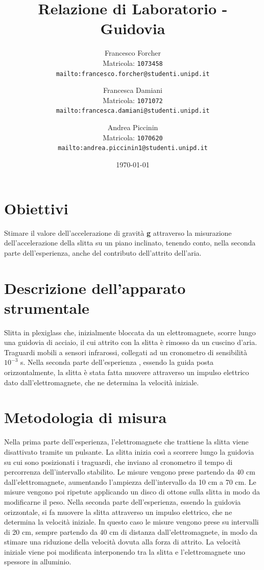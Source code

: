 \documentclass[12pt]{article} %
\title {Relazione di Laboratorio - Guidovia}
\author{Francesco Forcher\\
Matricola: \texttt{1073458}\\
\texttt{mailto:francesco.forcher@studenti.unipd.it}\\
\and
Francesca Damiani\\ 
Matricola: \texttt{1071072}\\
\texttt{mailto:francesca.damiani@studenti.unipd.it}\\
\and
Andrea Piccinin\\ 
Matricola: \texttt{1070620}\\
\texttt{mailto:andrea.piccinin1@studenti.unipd.it}\\
}
\date{\today}
\begin{document}
\maketitle %
\newpage
\tableofcontents %



        
\newpage
\section{Obiettivi}
	Stimare il valore dell'accelerazione di gravità \textbf{g} attraverso la misurazione dell'accelerazione della slitta su un piano 
	inclinato, tenendo conto, nella seconda parte dell'esperienza, anche del contributo dell'attrito dell'aria.

\section{Descrizione dell'apparato strumentale}
	Slitta in plexiglass che, inizialmente bloccata da un elettromagnete, scorre lungo una guidovia di acciaio, il cui attrito con la 		slitta è rimosso da un cuscino d'aria. 
	Traguardi mobili a sensori infrarossi, collegati ad un cronometro di sensibilità \(10^{-3}\) s.
	Nella seconda parte dell'esperienza , essendo la guida posta orizzontalmente, la slitta è stata fatta muovere attraverso un 		impulso elettrico dato dall'elettromagnete, che ne determina la velocità iniziale. 
	

\section{Metodologia di misura}
	Nella prima parte dell'esperienza, l'elettromagnete che trattiene la slitta viene disattivato tramite un pulsante. La slitta inizia 		così a scorrere lungo la guidovia su cui sono posizionati i traguardi, che inviano al cronometro il tempo di percorrenza 		dell'intervallo stabilito. Le misure vengono prese partendo da 40 cm dall'elettromagnete, aumentando l'ampiezza dell'intervallo da 10 		cm a 70 cm. Le misure vengono poi ripetute applicando un disco di ottone sulla slitta in modo da modificarne il peso.
	Nella seconda parte dell'esperienza, essendo la guidovia orizzontale, si fa muovere la slitta attraverso un impulso elettrico, che ne 		determina la velocità iniziale. In questo caso le misure vengono prese su intervalli di 20 cm, sempre partendo da 40 cm di distanza 		dall'elettromagnete, in modo da stimare una riduzione della velocità dovuta alla forza di attrito. La velocità iniziale viene poi 		modificata interponendo tra la slitta e l'elettromagnete uno spessore in alluminio.
\end{document}
